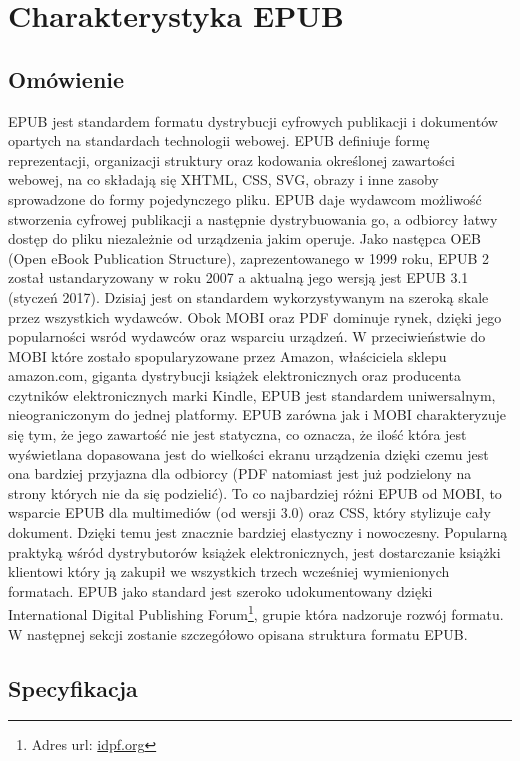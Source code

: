 \chapter{Charakterystyka EPUB}

\section{Omówienie}

EPUB jest standardem formatu dystrybucji cyfrowych publikacji i dokumentów opartych na standardach technologii webowej. EPUB definiuje formę reprezentacji, organizacji struktury oraz kodowania określonej zawartości webowej, na co składają się XHTML, CSS, SVG, obrazy i inne zasoby sprowadzone do formy pojedynczego pliku. EPUB daje wydawcom możliwość stworzenia cyfrowej publikacji a następnie dystrybuowania go, a odbiorcy łatwy dostęp do pliku niezależnie od urządzenia jakim operuje. Jako następca OEB (Open eBook Publication Structure), zaprezentowanego w 1999 roku, EPUB 2 został ustandaryzowany w roku 2007 a aktualną jego wersją jest EPUB 3.1 (styczeń 2017). Dzisiaj jest on standardem wykorzystywanym na szeroką skale przez wszystkich wydawców. Obok MOBI oraz PDF dominuje rynek, dzięki jego popularności wsród wydawców oraz wsparciu urządzeń. W przeciwieństwie do MOBI które zostało spopularyzowane przez Amazon, właściciela sklepu amazon.com, giganta dystrybucji książek elektronicznych oraz producenta czytników elektronicznych marki Kindle, EPUB jest standardem uniwersalnym, nieograniczonym do jednej platformy. EPUB zarówna jak i MOBI charakteryzuje się tym, że jego zawartość nie jest statyczna, co oznacza, że ilość która jest wyświetlana dopasowana jest do wielkości ekranu urządzenia dzięki czemu jest ona bardziej przyjazna dla odbiorcy (PDF natomiast jest już podzielony na strony których nie da się podzielić). To co najbardziej różni EPUB od MOBI, to wsparcie EPUB dla multimediów (od wersji 3.0) oraz CSS, który stylizuje cały dokument. Dzięki temu jest znacznie bardziej elastyczny i nowoczesny. Popularną praktyką wśród dystrybutorów książek elektronicznych, jest dostarczanie książki klientowi który ją zakupił we wszystkich trzech wcześniej wymienionych formatach. EPUB jako standard jest szeroko udokumentowany dzięki International Digital Publishing Forum\footnote{Adres url: \href{idpf.org}{idpf.org}}, grupie która nadzoruje rozwój formatu. W następnej sekcji zostanie szczegółowo opisana struktura formatu EPUB.

\section{Specyfikacja}

